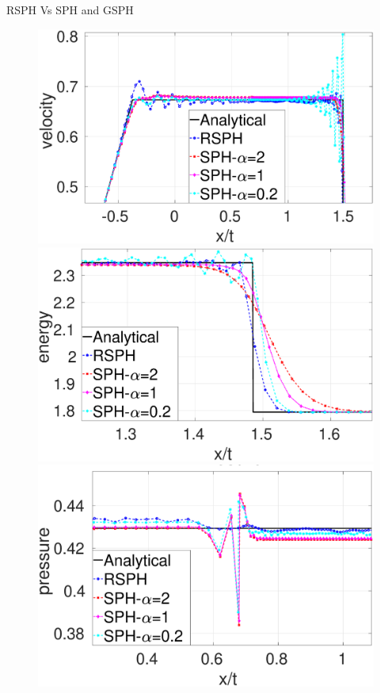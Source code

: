 \documentclass{beamer}
\begin{document}
\begin{frame}{RSPH Vs SPH and GSPH}
\begin{figure}[t]
    \centering
    \begin{minipage}{.33 \textwidth}
        \centering
        \includegraphics[width=0.99 \textwidth]{./Chapter-4/Figures/Sod/RCM-Sod-SPH-alf-v-zoom}
    \end{minipage}%
    \begin{minipage}{.33 \textwidth}
        \centering
        \includegraphics[width=0.99 \textwidth]{./Chapter-4/Figures/Sod/RCM-Sod-SPH-alf-e-zoom}
    \end{minipage}%
    \begin{minipage}{.33\textwidth}
        \centering
        \includegraphics[width=0.99 \textwidth]{./Chapter-4/Figures/Sod/RCM-Sod-SPH-alf-p-zoom}

\end{minipage}
\end{figure}
\end{frame}
\end{document}
